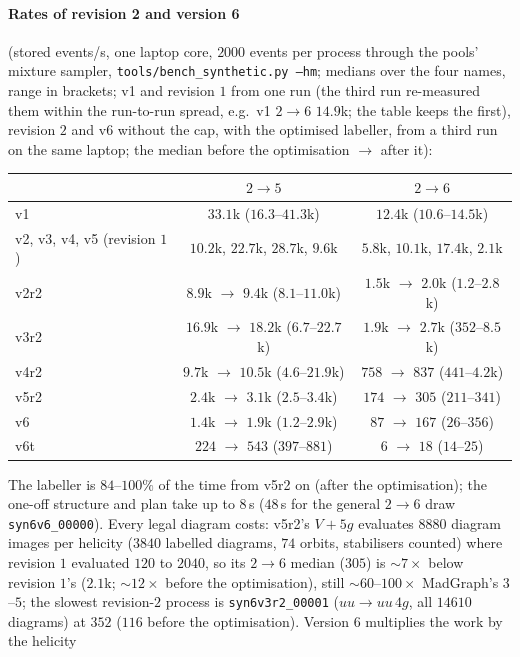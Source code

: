 \documentclass[11pt]{article}
\newcommand{\code}[1]{\texttt{#1}}
\begin{document}
\paragraph{Rates of revision 2 and version 6} (stored events/s, one laptop core, $2000$ events per process through the pools' mixture
sampler, \code{tools/bench\_synthetic.py --hm}; medians over the four names, range in brackets; v1 and revision $1$ from
one run (the third run re-measured them within the run-to-run spread, e.g.\ v1 $2\to6$ $14.9$k; the table
keeps the first), revision $2$ and v6 without the cap, with the optimised labeller, from a third run on the same laptop; the
median before the optimisation $\to$ after it):
\begin{center}\small
\begin{tabular}{lcc}
 & $2\to5$ & $2\to6$ \\ \hline
v1 & $33.1$k ($16.3$--$41.3$k) & $12.4$k ($10.6$--$14.5$k) \\
v2, v3, v4, v5 (revision $1$) & $10.2$k, $22.7$k, $28.7$k, $9.6$k & $5.8$k, $10.1$k, $17.4$k, $2.1$k \\
v2r2 & $8.9$k $\to$ $9.4$k ($8.1$--$11.0$k) & $1.5$k $\to$ $2.0$k ($1.2$--$2.8$k) \\
v3r2 & $16.9$k $\to$ $18.2$k ($6.7$--$22.7$k) & $1.9$k $\to$ $2.7$k ($352$--$8.5$k) \\
v4r2 & $9.7$k $\to$ $10.5$k ($4.6$--$21.9$k) & $758$ $\to$ $837$ ($441$--$4.2$k) \\
v5r2 & $2.4$k $\to$ $3.1$k ($2.5$--$3.4$k) & $174$ $\to$ $305$ ($211$--$341$) \\
v6 & $1.4$k $\to$ $1.9$k ($1.2$--$2.9$k) & $87$ $\to$ $167$ ($26$--$356$) \\
v6t & $224$ $\to$ $543$ ($397$--$881$) & $6$ $\to$ $18$ ($14$--$25$) \\
\end{tabular}
\end{center}
The labeller is $84$--$100\%$ of the time from v5r2 on (after the optimisation); the one-off structure and plan take up to $8$\,s ($48$\,s for
the general $2\to6$ draw \code{syn6v6\_00000}). Every legal diagram costs: v5r2's $V+5g$ evaluates $8880$ diagram
images per helicity ($3840$ labelled diagrams, $74$ orbits, stabilisers counted) where revision $1$ evaluated $120$ to
$2040$, so its $2\to6$ median ($305$) is $\sim\!7\times$ below revision $1$'s ($2.1$k; $\sim\!12\times$ before the
optimisation), still $\sim\!60$--$100\times$ MadGraph's $3$--$5$; the slowest revision-$2$ process is
\code{syn6v3r2\_00001} ($uu\to uu\,4g$, all $14610$ diagrams) at $352$ ($116$ before the optimisation). Version $6$ multiplies the work by the helicity
\end{document}
